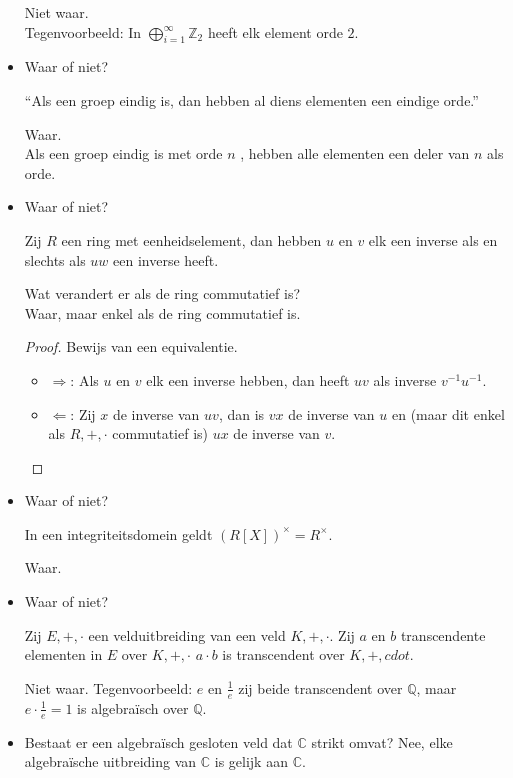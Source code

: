 \documentclass[main.tex]{subfiles}
\begin{document}
\begin{itemize}
   Niet waar.\\
   Tegenvoorbeeld: In $\bigoplus_{i=1}^{\infty}\mathbb{Z}_{2}$ heeft elk element orde $2$.
 \item Waar of niet?
   \begin{center}
     ``Als een groep eindig is, dan hebben al diens elementen een eindige orde.''
   \end{center}
   Waar.\\
   Als een groep eindig is met orde $n$ , hebben alle elementen een deler van $n$ als orde.
 \item Waar of niet?
   \begin{center}
     Zij $R$ een ring met eenheidselement, dan hebben $u$ en $v$ elk een inverse als en slechts als $uw$ een inverse heeft.
   \end{center}
   Wat verandert er als de ring commutatief is?\\
   Waar, maar enkel als de ring commutatief is.
   \begin{proof}
     Bewijs van een equivalentie.
     \begin{itemize}
     \item $\Rightarrow$: Als $u$ en $v$ elk een inverse hebben, dan heeft $uv$ als inverse $v^{-1}u^{-1}$.
     \item $\Leftarrow$: Zij $x$ de inverse van $uv$, dan is $vx$ de inverse van $u$ en (maar dit enkel als $R,+,\cdot$ commutatief is) $ux$ de inverse van $v$.
     \end{itemize}
   \end{proof}
 \item Waar of niet?
   \begin{center}
     In een integriteitsdomein geldt $(R[X])^{\times} = R^{\times}$.
   \end{center}
   Waar.
 \item Waar of niet?
   \begin{center}
     Zij $E,+,\cdot$ een velduitbreiding van een veld $K,+,\cdot$. 
     Zij $a$ en $b$ transcendente elementen in $E$ over $K,+,\cdot$
     $a\cdot b$ is transcendent over $K,+,cdot$.
   \end{center}
   Niet waar. Tegenvoorbeeld: $e$ en $\frac{1}{e}$ zij beide transcendent over $\mathbb{Q}$, maar $e \cdot \frac{1}{e}=1$ is algebra\"isch over $\mathbb{Q}$.
 \item Bestaat er een algebra\"isch gesloten veld dat $\mathbb{C}$ strikt omvat?
   Nee, elke algebra\"ische uitbreiding van $\mathbb{C}$ is gelijk aan $\mathbb{C}$.

\end{itemize}
\end{document}
